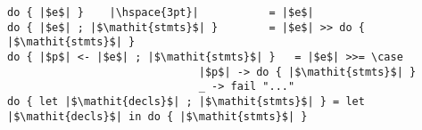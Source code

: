 \documentclass[12pt]{article}
\begin{document}
\pagestyle{empty}

\begin{verbatim}
do { |$e$| }    |\hspace{3pt}|           = |$e$|
do { |$e$| ; |$\mathit{stmts}$| }        = |$e$| >> do { |$\mathit{stmts}$| }
do { |$p$| <- |$e$| ; |$\mathit{stmts}$| }   = |$e$| >>= \case
                              |$p$| -> do { |$\mathit{stmts}$| }
                              _ -> fail "..."
do { let |$\mathit{decls}$| ; |$\mathit{stmts}$| } = let |$\mathit{decls}$| in do { |$\mathit{stmts}$| }
\end{verbatim}
\end{document}
